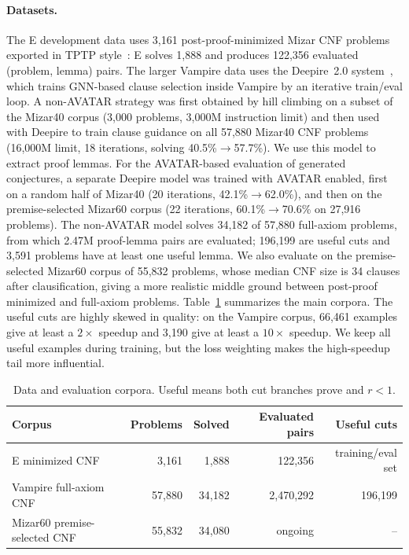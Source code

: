 \documentclass{easychair}
\newcommand{\Eprover}{E\xspace}
\newcommand{\Vampire}{Vampire\xspace}
\newcommand{\Mizar}{Mizar\xspace}
\begin{document}
\paragraph{Datasets.}
The \Eprover development data uses 3,161 post-proof-minimized \Mizar
CNF problems exported in TPTP style~\cite{Sutcliffe2009}: \Eprover solves 1,888 and produces 122,356 evaluated
(problem, lemma) pairs.  The larger \Vampire data uses the Deepire~2.0 system~\cite{Suda2025},
which trains GNN-based clause selection inside \Vampire by an
iterative train/eval loop.  A non-AVATAR strategy was first obtained
by hill climbing on a subset of the Mizar40 corpus (3,000 problems,
3,000M instruction limit) and then used with Deepire to train clause
guidance on all 57,880 Mizar40 CNF problems (16,000M limit, 18
iterations, solving 40.5\%$\to$57.7\%).  We use this model to extract
proof lemmas.  For the AVATAR-based evaluation of generated
conjectures, a separate Deepire model was trained with AVATAR enabled,
first on a random half of Mizar40 (20 iterations,
42.1\%$\to$62.0\%), and then on the premise-selected Mizar60 corpus
(22 iterations, 60.1\%$\to$70.6\% on 27,916 problems).  The
non-AVATAR model solves 34,182 of 57,880 full-axiom problems, from
which 2.47M proof-lemma pairs are evaluated; 196,199 are useful cuts
and 3,591 problems have at least one useful lemma.  We also evaluate on
the premise-selected Mizar60 corpus of 55,832 problems, whose median CNF
size is 34 clauses after clausification, giving a more realistic middle
ground between post-proof minimized and full-axiom problems.
Table~\ref{tab:data} summarizes the main corpora.  The useful
cuts are highly skewed in quality: on the \Vampire corpus, 66,461
examples give at least a $2\times$ speedup and 3,190 give at least a
$10\times$ speedup.  We keep all useful examples during training, but
the loss weighting makes the high-speedup tail more influential.

\begin{table}[t]
\centering
\caption{Data and evaluation corpora.  Useful means both cut branches
prove and $r<1$.}
\label{tab:data}
\small
\begin{tabular}{lrrrr}
\toprule
Corpus & Problems & Solved & Evaluated pairs & Useful cuts \\
\midrule
\Eprover minimized CNF & 3,161 & 1,888 & 122,356 & training/eval set \\
\Vampire full-axiom CNF & 57,880 & 34,182 & 2,470,292 & 196,199 \\
Mizar60 premise-selected CNF & 55,832 & 34,080 & ongoing & -- \\
\bottomrule
\end{tabular}
\end{table}
\end{document}
